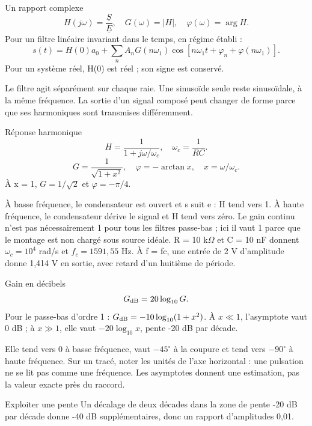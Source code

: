 \begin{loi}{Un rapport complexe}
\[H(j\omega)=\frac{\underline S}{\underline E},\quad G(\omega)=|H|,\quad \varphi(\omega)=\arg H.\]Pour un filtre linéaire invariant dans le temps, en régime établi :\[s(t)=H(0)a_0+\sum_n A_nG(n\omega_1)\cos[n\omega_1t+\varphi_n+\varphi(n\omega_1)].\]Pour un système réel, H(0) est réel ; son signe est conservé.
\end{loi}
Le filtre agit séparément sur chaque raie. Une sinusoïde seule reste sinusoïdale, à la même fréquence. La sortie d’un signal composé peut changer de forme parce que ses harmoniques sont transmises différemment.


\begin{loi}{Réponse harmonique}
\[H=\frac1{1+j\omega/\omega_c},\quad \omega_c=\frac1{RC}.\]\[G=\frac1{\sqrt{1+x^2}},\quad\varphi=-\arctan x,\quad x=\omega/\omega_c.\]À x = 1, $G=1/\sqrt2$ et $\varphi=-\pi/4$.
\end{loi}
À basse fréquence, le condensateur est ouvert et s suit e : H tend vers 1. À haute fréquence, le condensateur dérive le signal et H tend vers zéro. Le gain continu n’est pas nécessairement 1 pour tous les filtres passe-bas ; ici il vaut 1 parce que le montage est non chargé sous source idéale.
R = 10 k$\Omega$ et C = 10 nF donnent $\omega_c=10^4$ rad/s et $f_c=1591{,}55$ Hz. À f = fc, une entrée de 2 V d’amplitude donne 1,414 V en sortie, avec retard d’un huitième de période.


\begin{loi}{Gain en décibels}
\[G_{\rm dB}=20\log_{10}G.\]Pour le passe-bas d’ordre 1 : $G_{\rm dB}=-10\log_{10}(1+x^2)$. À $x\ll1$, l’asymptote vaut 0 dB ; à $x\gg1$, elle vaut $-20\log_{10}x$, pente -20 dB par décade.
\end{loi}
Elle tend vers 0 à basse fréquence, vaut $-45^\circ$ à la coupure et tend vers $-90^\circ$ à haute fréquence. Sur un tracé, noter les unités de l’axe horizontal : une pulsation ne se lit pas comme une fréquence. Les asymptotes donnent une estimation, pas la valeur exacte près du raccord.
\begin{methode}{Exploiter une pente}
Un décalage de deux décades dans la zone de pente -20 dB par décade donne -40 dB supplémentaires, donc un rapport d’amplitudes 0,01.
\end{methode}



